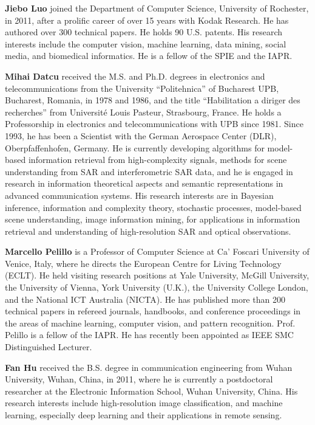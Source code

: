 \documentclass[a4paper]{article}
\begin{document}
\noindent\textbf{Jiebo Luo} joined the
Department of Computer Science, University of
Rochester, in 2011, after a prolific career of over
15 years with Kodak Research. He has authored
over 300 technical papers. He holds 90 U.S. patents.
His research interests include the computer vision,
machine learning, data mining, social media, and
biomedical informatics. He is a fellow of the SPIE and the IAPR.
\vspace{3mm}

\noindent\textbf{Mihai Datcu} received the M.S. and Ph.D. degrees
in electronics and telecommunications from the University
“Politehnica” of Bucharest UPB, Bucharest,
Romania, in 1978 and 1986, and the title “Habilitation
a diriger des recherches” from Université Louis
Pasteur, Strasbourg, France.
He holds a Professorship in electronics and
telecommunications with UPB since 1981. Since
1993, he has been a Scientist with the German
Aerospace Center (DLR), Oberpfaffenhofen,
Germany. He is currently developing algorithms
for model-based information retrieval from high-complexity signals, methods
for scene understanding from SAR and interferometric SAR data, and he is
engaged in research in information theoretical aspects and semantic representations
in advanced communication systems. His research interests are in Bayesian inference, information and complexity
theory, stochastic processes, model-based scene understanding, image
information mining, for applications in information retrieval and understanding
of high-resolution SAR and optical observations.
\vspace{3mm}

\noindent\textbf{Marcello Pelillo } is a Professor
of Computer Science at Ca’ Foscari University of
Venice, Italy, where he directs the European Centre
for Living Technology (ECLT). He held visiting
research positions at Yale University, McGill University,
the University of Vienna, York University
(U.K.), the University College London, and the
National ICT Australia (NICTA). He has published
more than 200 technical papers in refereed journals,
handbooks, and conference proceedings in the areas
of machine learning, computer vision, and pattern
recognition.
Prof. Pelillo is a fellow of the IAPR. He has recently been appointed
as IEEE SMC Distinguished Lecturer.
\vspace{3mm}

\noindent\textbf{Fan Hu } received the B.S. degree in communication
engineering from Wuhan University,
Wuhan, China, in 2011, where he is currently a postdoctoral researcher at the Electronic Information School, Wuhan University, China.
His research interests include high-resolution
image classification, and machine learning, especially
deep learning and their applications in remote
sensing.
\vspace{3mm}
\end{document}
